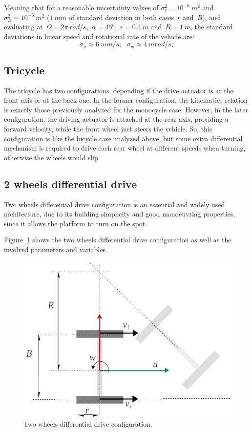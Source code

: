 Meaning that for a reasonable uncertainty values of $\sigma^2_r=10^{-6}\ m^2$ and $\sigma^2_B=10^{-6}\ m^2$ ($1\ mm$ of standard deviation in both cases~$r$ and~$B$), and evaluating at~$\Omega=2\pi\ rad/s$,~$\alpha=45^o$,~$r=0.4\ m$ and~$B=1\ m$, the standard deviations in linear speed and rotational rate of the vehicle are: 
\begin{equation}
 \sigma_u \approx 6\ mm/s ; \ \ \ \sigma_w \approx 4\ mrad/s ;
\end{equation}


\subsection{Tricycle}
The tricycle has two configurations, depending if the drive actuator is at the front axis or at the back one. In the former configuration, the kinematics relation is exactly those previously analyzed for the monocycle case. However, in the later configuration, the driving actuator is attached at the rear axis, providing a forward velocity, while the front wheel just steers the vehicle. So, this configuration is like the bicycle case analyzed above, but some extra differential mechanism is required to drive each rear wheel at different speeds when turning, otherwise the wheels would slip. 


\subsection{2 wheels differential drive}
Two wheels differential drive configuration is an essential and widely used architecture, due to its building simplicity and good manoeuvring properties, since it allows the platform to turn on the spot. 

Figure~\ref{fig:differential_kinematics} shows the two wheels differential drive configuration as well as the involved parameters and variables. 
\begin{figure}[bth!]
  \begin{center}
    \includegraphics[width=1.0\columnwidth]{figures/differential_kinematics.png}
    \caption{Two wheels differential drive configuration.}
    \label{fig:differential_kinematics}
  \end{center}
\end{figure}

